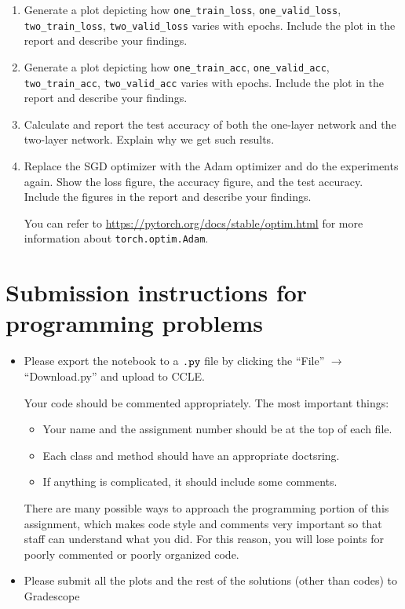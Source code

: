 \documentclass[11pt]{article}
\begin{document}
\begin{enumerate}[resume]
\item Generate a plot depicting how \verb|one_train_loss|, \verb|one_valid_loss|, \verb|two_train_loss|, \verb|two_valid_loss| varies with epochs. Include the plot in the report and describe your findings. 

\solution{}

\item Generate a plot depicting how \verb|one_train_acc|, \verb|one_valid_acc|, \verb|two_train_acc|, \verb|two_valid_acc| varies with epochs. Include the plot in the report and describe your findings. 

\solution{}

\item Calculate and report the test accuracy of both the one-layer network and the two-layer network. Explain why we get such results. 

\solution{}

\item {Replace the SGD optimizer with the Adam optimizer and do the experiments again. Show the loss figure, the accuracy figure, and the test accuracy. Include the figures in the report and describe your findings. 

You can refer to \url{https://pytorch.org/docs/stable/optim.html} for more information about \verb|torch.optim.Adam|.

\solution{}

}


\end{enumerate}



\section*{Submission instructions for programming problems}
\begin{itemize}
\item Please export the notebook to a $\verb|.py|$ file by clicking the “File” $\rightarrow$ “Download.py” and upload to CCLE. 

Your code should be commented appropriately. The most important things:
\vspace{-\parskip}
\begin{itemize}[nosep]
\item Your name and the assignment number should be at the top of each file.
\item Each class and method should have an appropriate doctsring.
\item If anything is complicated, it should include some comments.
\end{itemize}
\vspace{-\parskip}
There are many possible ways to approach the programming portion of this assignment, which makes code style and comments very important so that staff can understand what you did. For this reason, you will lose points for poorly commented or poorly organized code.
\end{itemize}

\begin{itemize}
\item Please submit all the plots and the rest of the solutions (other than codes) to Gradescope
\end{itemize}
\end{document}
